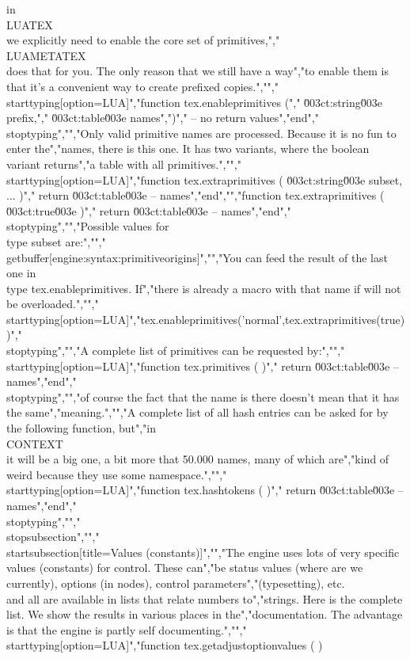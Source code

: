 in \\LUATEX\\ we explicitly need to enable the core set of primitives,","\\LUAMETATEX\\ does that for you. The only reason that we still have a way","to enable them is that it's a convenient way to create prefixed copies.","","\\starttyping[option=LUA]","function tex.enableprimitives (","    \u003ct:string\u003e prefix,","    \u003ct:table\u003e  names",")","    -- no return values","end","\\stoptyping","","Only valid primitive names are processed. Because it is no fun to enter the","names, there is this one. It has two variants, where the boolean variant returns","a table with all primitives.","","\\starttyping[option=LUA]","function tex.extraprimitives ( \u003ct:string\u003e subset, ... )","    return \u003ct:table\u003e -- names","end","","function tex.extraprimitives ( \u003ct:true\u003e )","    return \u003ct:table\u003e -- names","end","\\stoptyping","","Possible values for \\type {subset} are:","","\\getbuffer[engine:syntax:primitiveorigins]","","You can feed the result of the last one in \\type {tex.enableprimitives}. If","there is already a macro with that name if will not be overloaded.","","\\starttyping[option=LUA]","tex.enableprimitives('normal',tex.extraprimitives(true))","\\stoptyping","","A complete list of primitives can be requested by:","","\\starttyping[option=LUA]","function tex.primitives ( )","    return \u003ct:table\u003e -- names","end","\\stoptyping","","of course the fact that the name is there doesn't mean that it has the same","meaning.","","A complete list of all hash entries can be asked for by the following function, but","in \\CONTEXT\\ it will be a big one, a bit more that 50.000 names, many of which are","kind of weird because they use some namespace.","","\\starttyping[option=LUA]","function tex.hashtokens ( )","    return \u003ct:table\u003e -- names","end","\\stoptyping","","\\stopsubsection","","\\startsubsection[title=Values (constants)]","","The engine uses lots of very specific values (constants) for control. These can","be status values (where are we currently), options (in nodes), control parameters","(typesetting), etc.\\ and all are available in lists that relate numbers to","strings. Here is the complete list. We show the results in various places in the","documentation. The advantage is that the engine is partly self documenting.","","\\starttyping[option=LUA]","function tex.getadjustoptionvalues        ( ) 